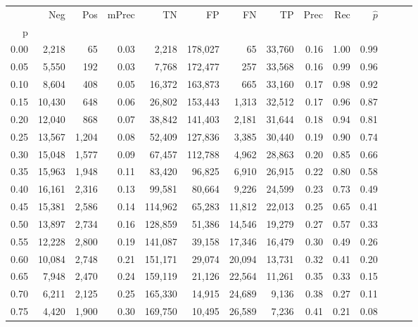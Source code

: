 \begin{tabular}{rrrrrrrrrrrrrr}
\toprule
{} &     Neg &    Pos & mPrec &       TN &       FP &      FN &      TP &  Prec &   Rec & $\hat{p}$ \\
p    &         &        &       &          &          &         &         &       &       &           \\
\midrule
0.00 &   2,218 &     65 &  0.03 &    2,218 &  178,027 &      65 &  33,760 &  0.16 &  1.00 &      0.99 \\
0.05 &   5,550 &    192 &  0.03 &    7,768 &  172,477 &     257 &  33,568 &  0.16 &  0.99 &      0.96 \\
0.10 &   8,604 &    408 &  0.05 &   16,372 &  163,873 &     665 &  33,160 &  0.17 &  0.98 &      0.92 \\
0.15 &  10,430 &    648 &  0.06 &   26,802 &  153,443 &   1,313 &  32,512 &  0.17 &  0.96 &      0.87 \\
0.20 &  12,040 &    868 &  0.07 &   38,842 &  141,403 &   2,181 &  31,644 &  0.18 &  0.94 &      0.81 \\
0.25 &  13,567 &  1,204 &  0.08 &   52,409 &  127,836 &   3,385 &  30,440 &  0.19 &  0.90 &      0.74 \\
0.30 &  15,048 &  1,577 &  0.09 &   67,457 &  112,788 &   4,962 &  28,863 &  0.20 &  0.85 &      0.66 \\
0.35 &  15,963 &  1,948 &  0.11 &   83,420 &   96,825 &   6,910 &  26,915 &  0.22 &  0.80 &      0.58 \\
0.40 &  16,161 &  2,316 &  0.13 &   99,581 &   80,664 &   9,226 &  24,599 &  0.23 &  0.73 &      0.49 \\
0.45 &  15,381 &  2,586 &  0.14 &  114,962 &   65,283 &  11,812 &  22,013 &  0.25 &  0.65 &      0.41 \\
0.50 &  13,897 &  2,734 &  0.16 &  128,859 &   51,386 &  14,546 &  19,279 &  0.27 &  0.57 &      0.33 \\
0.55 &  12,228 &  2,800 &  0.19 &  141,087 &   39,158 &  17,346 &  16,479 &  0.30 &  0.49 &      0.26 \\
0.60 &  10,084 &  2,748 &  0.21 &  151,171 &   29,074 &  20,094 &  13,731 &  0.32 &  0.41 &      0.20 \\
0.65 &   7,948 &  2,470 &  0.24 &  159,119 &   21,126 &  22,564 &  11,261 &  0.35 &  0.33 &      0.15 \\
0.70 &   6,211 &  2,125 &  0.25 &  165,330 &   14,915 &  24,689 &   9,136 &  0.38 &  0.27 &      0.11 \\
0.75 &   4,420 &  1,900 &  0.30 &  169,750 &   10,495 &  26,589 &   7,236 &  0.41 &  0.21 &      0.08 \\

\end{tabular}
